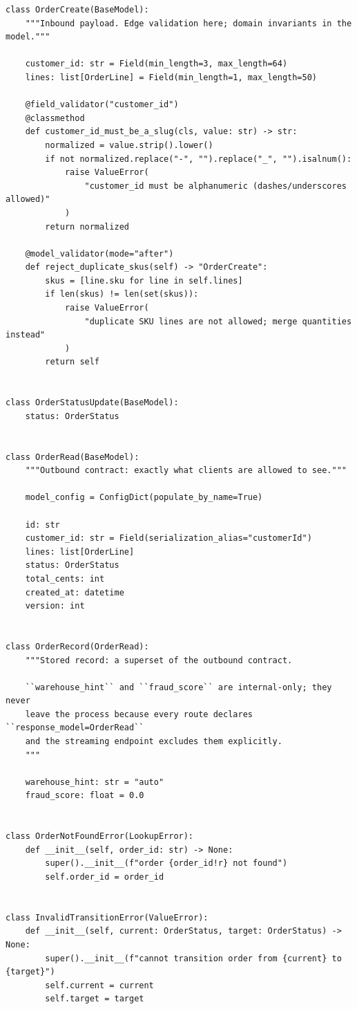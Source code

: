 \begin{verbatim}
class OrderCreate(BaseModel):
    """Inbound payload. Edge validation here; domain invariants in the model."""

    customer_id: str = Field(min_length=3, max_length=64)
    lines: list[OrderLine] = Field(min_length=1, max_length=50)

    @field_validator("customer_id")
    @classmethod
    def customer_id_must_be_a_slug(cls, value: str) -> str:
        normalized = value.strip().lower()
        if not normalized.replace("-", "").replace("_", "").isalnum():
            raise ValueError(
                "customer_id must be alphanumeric (dashes/underscores allowed)"
            )
        return normalized

    @model_validator(mode="after")
    def reject_duplicate_skus(self) -> "OrderCreate":
        skus = [line.sku for line in self.lines]
        if len(skus) != len(set(skus)):
            raise ValueError(
                "duplicate SKU lines are not allowed; merge quantities instead"
            )
        return self


class OrderStatusUpdate(BaseModel):
    status: OrderStatus


class OrderRead(BaseModel):
    """Outbound contract: exactly what clients are allowed to see."""

    model_config = ConfigDict(populate_by_name=True)

    id: str
    customer_id: str = Field(serialization_alias="customerId")
    lines: list[OrderLine]
    status: OrderStatus
    total_cents: int
    created_at: datetime
    version: int


class OrderRecord(OrderRead):
    """Stored record: a superset of the outbound contract.

    ``warehouse_hint`` and ``fraud_score`` are internal-only; they never
    leave the process because every route declares ``response_model=OrderRead``
    and the streaming endpoint excludes them explicitly.
    """

    warehouse_hint: str = "auto"
    fraud_score: float = 0.0


class OrderNotFoundError(LookupError):
    def __init__(self, order_id: str) -> None:
        super().__init__(f"order {order_id!r} not found")
        self.order_id = order_id


class InvalidTransitionError(ValueError):
    def __init__(self, current: OrderStatus, target: OrderStatus) -> None:
        super().__init__(f"cannot transition order from {current} to {target}")
        self.current = current
        self.target = target



\end{verbatim}
